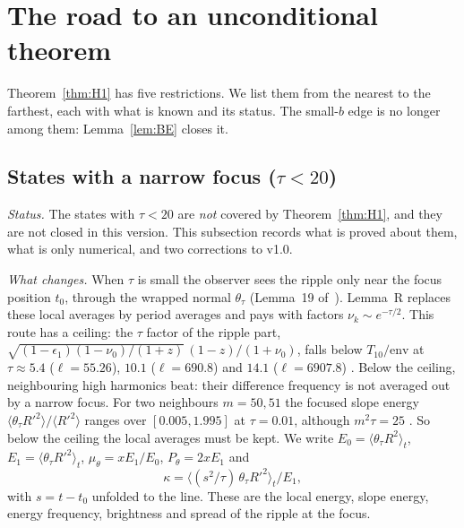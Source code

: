 \section{The road to an unconditional theorem}
\label{sec:open}

Theorem~\ref{thm:H1} has five restrictions.
We list them from the nearest to the farthest, each with what is known and its status.
The small-$b$ edge is no longer among them: Lemma~\ref{lem:BE} closes it.

\subsection{States with a narrow focus ($\tau<20$)}
\label{sec:open:tau}

\emph{Status.} The states with $\tau<20$ are \emph{not} covered by Theorem~\ref{thm:H1}, and they are not closed in this version.
This subsection records what is proved about them, what is only numerical, and two corrections to v1.0.

\emph{What changes.}
When $\tau$ is small the observer sees the ripple only near the focus position $t_0$, through the wrapped normal $\theta_\tau$ (Lemma~19 of~\cite{F}).
Lemma~R replaces these local averages by period averages and pays with factors $\nu_k\sim e^{-\tau/2}$.
This route has a ceiling: the $\tau$ factor of the ripple part, $\sqrt{(1-\epsilon_1)(1-\nu_0)/(1+z)}\,(1-z)/(1+\nu_0)$, falls below $T_{10}/\mathrm{env}$ at $\tau\approx5.4$ ($\ell=55.26$), $10.1$ ($\ell=690.8$) and $14.1$ ($\ell=6907.8$) \derivst.
Below the ceiling, neighbouring high harmonics beat: their difference frequency is not averaged out by a narrow focus.
For two neighbours $m=50,51$ the focused slope energy $\langle\theta_\tau R'^2\rangle/\langle R'^2\rangle$ ranges over $[0.005,1.995]$ at $\tau=0.01$, although $m^2\tau=25$ \numst.
So below the ceiling the local averages must be kept.
We write $E_0=\langle\theta_\tau R^2\rangle_t$, $E_1=\langle\theta_\tau R'^2\rangle_t$, $\mu_\theta=xE_1/E_0$, $P_\theta=2xE_1$ and
\begin{equation}
\kappa=\langle(s^2/\tau)\,\theta_\tau R'^2\rangle_t/E_1,
\end{equation}
with $s=t-t_0$ unfolded to the line.
These are the local energy, slope energy, energy frequency, brightness and spread of the ripple at the focus.

